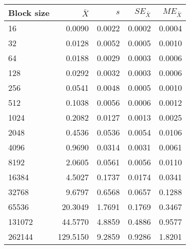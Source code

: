 \begin{tabular}{lrrrr}\toprule
{\small Block size} & $\bar{X}$ & $s$ & $SE_{\bar{X}}$ & $ME_{\bar{X}}$ \\\midrule
16 & 0.0090 & 0.0022 & 0.0002 & 0.0004\\
32 & 0.0128 & 0.0052 & 0.0005 & 0.0010\\
64 & 0.0188 & 0.0029 & 0.0003 & 0.0006\\
128 & 0.0292 & 0.0032 & 0.0003 & 0.0006\\
256 & 0.0541 & 0.0048 & 0.0005 & 0.0010\\
512 & 0.1038 & 0.0056 & 0.0006 & 0.0012\\
1024 & 0.2082 & 0.0127 & 0.0013 & 0.0025\\
2048 & 0.4536 & 0.0536 & 0.0054 & 0.0106\\
4096 & 0.9690 & 0.0314 & 0.0031 & 0.0061\\
8192 & 2.0605 & 0.0561 & 0.0056 & 0.0110\\
16384 & 4.5027 & 0.1737 & 0.0174 & 0.0341\\
32768 & 9.6797 & 0.6568 & 0.0657 & 0.1288\\
65536 & 20.3049 & 1.7691 & 0.1769 & 0.3467\\
131072 & 44.5770 & 4.8859 & 0.4886 & 0.9577\\
262144 & 129.5150 & 9.2859 & 0.9286 & 1.8201\\
\bottomrule
\end{tabular}
